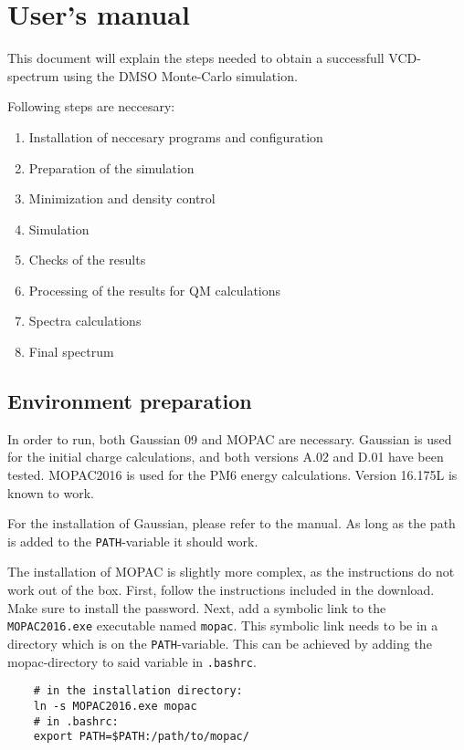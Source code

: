\documentclass[a4paper,fleqn]{report}
\begin{document}
	
	\chapter{User's manual}

	
	This document will explain the steps needed to obtain a successfull VCD-spectrum using the DMSO Monte-Carlo simulation.
	
	Following steps are neccesary:
	\begin{enumerate}
		\setlength{\itemsep}{-1pt}
		\setlength{\parsep}{-1pt}
		\item Installation of neccesary programs and configuration
		\item Preparation of the simulation
		\item Minimization and density control
		\item Simulation
		\item Checks of the results
		\item Processing of the results for QM calculations
		\item Spectra calculations
		\item Final spectrum
	\end{enumerate}
	
	\section{Environment preparation}
	In order to run, both Gaussian 09 and MOPAC are necessary. Gaussian is used for the initial charge calculations, and both versions A.02 and D.01 have been tested.
	MOPAC2016 is used for the PM6 energy calculations. Version 16.175L is known to work.
	
	For the installation of Gaussian, please refer to the manual. As long as the path is added to the \verb|PATH|-variable it should work.
	
	The installation of MOPAC is slightly more complex, as the instructions do not work out of the box.
	First, follow the instructions included in the download. Make sure to install the password.
	Next, add a symbolic link to the \verb|MOPAC2016.exe| executable named \verb|mopac|.
	This symbolic link needs to be in a directory which is on the \verb|PATH|-variable. This can be achieved by adding the mopac-directory to said variable in \verb|.bashrc|.
	
	\begin{lstlisting}
	# in the installation directory:
	ln -s MOPAC2016.exe mopac
	# in .bashrc:
	export PATH=$PATH:/path/to/mopac/
	\end{lstlisting}
	
	
	
\end{document}
